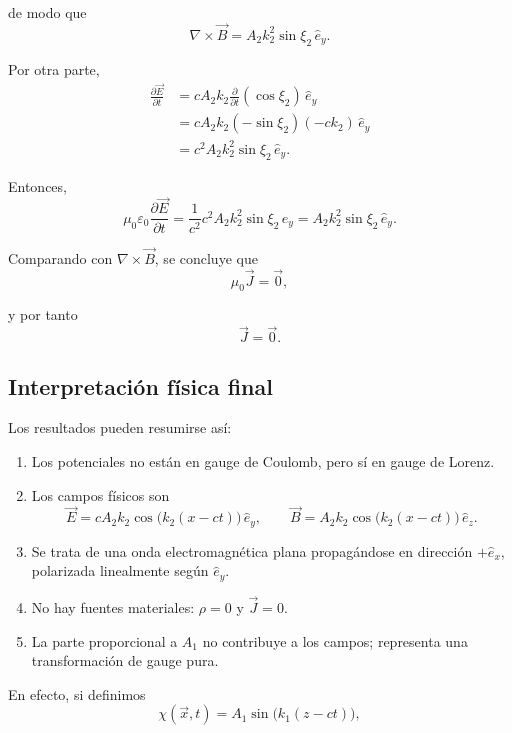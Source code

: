 \documentclass{article}
\numberwithin{equation}{section}
\begin{document}
de modo que
\begin{equation}
\nabla\times\vec B=A_2k_2^2\sin\xi_2\,\hat e_y.
\end{equation}

Por otra parte,
\begin{align}
\frac{\partial\vec E}{\partial t}
&=cA_2k_2\frac{\partial}{\partial t}(\cos\xi_2)\,\hat e_y \\
&=cA_2k_2(-\sin\xi_2)(-ck_2)\,\hat e_y \\
&=c^2A_2k_2^2\sin\xi_2\,\hat e_y.
\end{align}

Entonces,
\begin{equation}
\mu_0\varepsilon_0\frac{\partial\vec E}{\partial t}=\frac{1}{c^2}c^2A_2k_2^2\sin\xi_2\,\hat e_y=A_2k_2^2\sin\xi_2\,\hat e_y.
\end{equation}

Comparando con $\nabla\times\vec B$, se concluye que
\begin{equation}
\mu_0\vec J=\vec 0,
\end{equation}

y por tanto
\begin{equation}
\boxed{\vec J=\vec 0.}
\end{equation}

\subsection{Interpretación física final}
Los resultados pueden resumirse así:
\begin{enumerate}
    \item Los potenciales no están en gauge de Coulomb, pero sí en gauge de Lorenz.
    \item Los campos físicos son
    \begin{equation}
    \vec E=cA_2k_2\cos\big(k_2(x-ct)\big)\,\hat e_y,
    \qquad
    \vec B=A_2k_2\cos\big(k_2(x-ct)\big)\,\hat e_z.
    \end{equation}
    \item Se trata de una onda electromagnética plana propagándose en dirección $+\hat e_x$, polarizada linealmente según $\hat e_y$.
    \item No hay fuentes materiales: $\rho=0$ y $\vec J=0$.
    \item La parte proporcional a $A_1$ no contribuye a los campos; representa una transformación de gauge pura.
\end{enumerate}

En efecto, si definimos
\begin{equation}
\chi(\vec x,t)=A_1\sin\big(k_1(z-ct)\big),
\end{equation}
\end{document}
